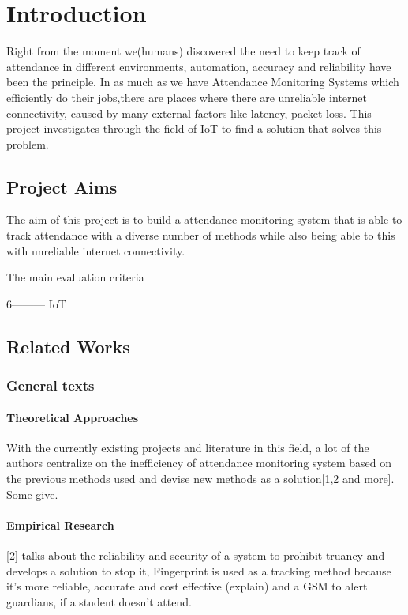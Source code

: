 \chapter{Introduction}
Right from the moment we(humans) discovered the need to keep track of attendance in different environments, automation, accuracy and reliability have been the principle. In as much as we have Attendance Monitoring Systems which efficiently do their jobs,there are places where there are unreliable internet connectivity, caused by many external factors like latency, packet loss. This project investigates through the field of IoT to find a solution that solves this problem.


\section{Project Aims}

The aim of this project is to build a attendance monitoring system that is able to track attendance with a diverse number of methods while also being able to this with unreliable internet connectivity. 

The main evaluation criteria




6---------
\gls{IoT}

\section{Related Works} 

\subsection{General texts}

\subsubsection{Theoretical Approaches}
With the currently existing projects and literature in this field, a lot of the authors centralize on the inefficiency of attendance monitoring system based on the previous methods used and devise new methods as a solution[1,2 and more]. Some give.

\subsubsection{Empirical Research}
[2] talks about the reliability and security of a system to prohibit truancy and develops a solution to stop it, Fingerprint is used as a tracking method because it's more reliable, accurate and cost effective (explain) and a GSM to alert guardians, if a student doesn't attend.

